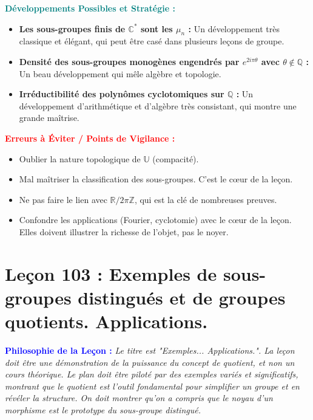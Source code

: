 \documentclass[12pt, a4paper, parskip=full]{report}
\theoremstyle{agregstyle}
\newenvironment{philosophie}
  {\par\medskip\noindent\begin{oframed}\noindent\textbf{\textcolor{blue}{Philosophie de la Leçon :}}\itshape}
  {\end{oframed}\par\medskip}
\newenvironment{developpements}
  {\par\medskip\noindent\begin{oframed}\noindent\textbf{\textcolor{teal}{Développements Possibles et Stratégie :}}}
  {\end{oframed}\par\medskip}
\newenvironment{erreurs}
  {\par\medskip\noindent\begin{oframed}\noindent\textbf{\textcolor{red}{Erreurs à Éviter / Points de Vigilance :}}}
  {\end{oframed}\par\medskip}
\begin{document}
\begin{developpements}
    \begin{itemize}
        \item \textbf{Les sous-groupes finis de $\mathbb{C}^*$ sont les $\mu_n$ :} Un développement très classique et élégant, qui peut être casé dans plusieurs leçons de groupe.
        \item \textbf{Densité des sous-groupes monogènes engendrés par $e^{2i\pi\theta}$ avec $\theta \notin \mathbb{Q}$ :} Un beau développement qui mêle algèbre et topologie.
        \item \textbf{Irréductibilité des polynômes cyclotomiques sur $\mathbb{Q}$ :} Un développement d'arithmétique et d'algèbre très consistant, qui montre une grande maîtrise.
    \end{itemize}
\end{developpements}

\begin{erreurs}
    \begin{itemize}
        \item Oublier la nature topologique de $\mathbb{U}$ (compacité).
        \item Mal maîtriser la classification des sous-groupes. C'est le cœur de la leçon.
        \item Ne pas faire le lien avec $\mathbb{R}/2\pi\mathbb{Z}$, qui est la clé de nombreuses preuves.
        \item Confondre les applications (Fourier, cyclotomie) avec le cœur de la leçon. Elles doivent illustrer la richesse de l'objet, pas le noyer.
    \end{itemize}
\end{erreurs}

\newpage
\chapter{Leçon 103 : Exemples de sous-groupes distingués et de groupes quotients. Applications.}

\begin{philosophie}
    Le titre est "Exemples... Applications.". La leçon doit être une démonstration de la puissance du concept de quotient, et non un cours théorique. Le plan doit être piloté par des exemples variés et significatifs, montrant que le quotient est l'outil fondamental pour simplifier un groupe et en révéler la structure. On doit montrer qu'on a compris que le noyau d'un morphisme est le prototype du sous-groupe distingué.
\end{philosophie}
\end{document}
